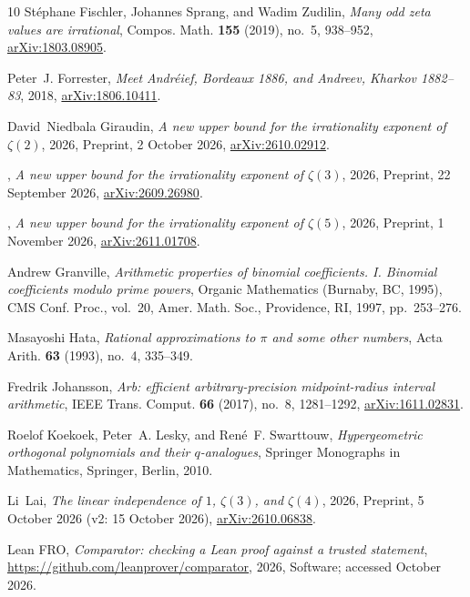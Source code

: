 \documentclass[11pt]{amsart}
\theoremstyle{definition}
\theoremstyle{remark}
\numberwithin{equation}{section}
\begin{document}
\begin{thebibliography}{10}
St\'ephane Fischler, Johannes Sprang, and Wadim Zudilin, \emph{Many odd zeta
  values are irrational}, Compos. Math. \textbf{155} (2019), no.~5, 938--952,
  \href{https://arxiv.org/abs/1803.08905}{arXiv:1803.08905}.

Peter~J. Forrester, \emph{Meet {A}ndr\'eief, {B}ordeaux 1886, and {A}ndreev,
  {K}harkov 1882--83}, 2018,
  \href{https://arxiv.org/abs/1806.10411}{arXiv:1806.10411}.

David~Niedbala Giraudin, \emph{A new upper bound for the irrationality exponent
  of {$\zeta(2)$}}, 2026, Preprint, 2 October 2026,
  \href{https://arxiv.org/abs/2610.02912}{arXiv:2610.02912}.

\bysame, \emph{A new upper bound for the irrationality exponent of
  {$\zeta(3)$}}, 2026, Preprint, 22 September 2026,
  \href{https://arxiv.org/abs/2609.26980}{arXiv:2609.26980}.

\bysame, \emph{A new upper bound for the irrationality exponent of
  {$\zeta(5)$}}, 2026, Preprint, 1 November 2026,
  \href{https://arxiv.org/abs/2611.01708}{arXiv:2611.01708}.

Andrew Granville, \emph{Arithmetic properties of binomial coefficients. {I}.
  {B}inomial coefficients modulo prime powers}, Organic Mathematics (Burnaby,
  BC, 1995), CMS Conf. Proc., vol.~20, Amer. Math. Soc., Providence, RI, 1997,
  pp.~253--276.

Masayoshi Hata, \emph{Rational approximations to {$\pi$} and some other
  numbers}, Acta Arith. \textbf{63} (1993), no.~4, 335--349.

Fredrik Johansson, \emph{Arb: efficient arbitrary-precision midpoint-radius
  interval arithmetic}, IEEE Trans. Comput. \textbf{66} (2017), no.~8,
  1281--1292, \href{https://arxiv.org/abs/1611.02831}{arXiv:1611.02831}.

Roelof Koekoek, Peter~A. Lesky, and Ren\'e~F. Swarttouw, \emph{Hypergeometric
  orthogonal polynomials and their {$q$}-analogues}, Springer Monographs in
  Mathematics, Springer, Berlin, 2010.

Li~Lai, \emph{The linear independence of {$1$}, {$\zeta(3)$}, and
  {$\zeta(4)$}}, 2026, Preprint, 5 October 2026 (v2: 15 October 2026),
  \href{https://arxiv.org/abs/2610.06838}{arXiv:2610.06838}.

{Lean FRO}, \emph{Comparator: checking a {L}ean proof against a trusted
  statement}, \url{https://github.com/leanprover/comparator}, 2026, Software;
  accessed October 2026.


\end{thebibliography}
\end{document}
